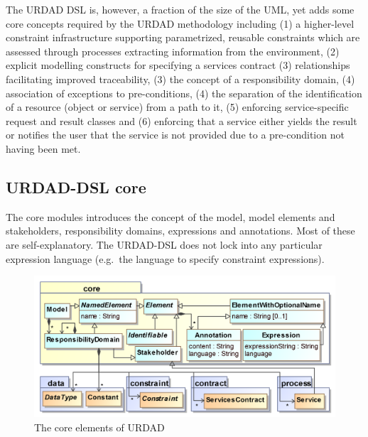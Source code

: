 The URDAD DSL is, however, a fraction of the size of the UML, yet adds some core concepts required by the URDAD methodology including (1) a higher-level constraint infrastructure supporting parametrized, reusable constraints which are assessed through processes extracting information from the environment, (2) explicit modelling constructs for specifying a services contract (3) relationships facilitating improved traceability, (3) the concept of a responsibility domain, (4) association of exceptions to pre-conditions, (4)
the separation of the identification of a resource (object or service) from a path to it, (5) enforcing service-specific request and result classes and (6) enforcing that a service either yields the result or notifies the user that the service is not provided due to a pre-condition not having been met.


\subsection{URDAD-DSL core}

The core modules introduces the concept of the model, model elements and stakeholders, responsibility domains, expressions and annotations. Most of these are self-explanatory. The URDAD-DSL does not lock into any particular expression language (e.g.\ the language to specify constraint expressions). 

\begin{figure}[Htb]
  \centering
  \includegraphics{core}
  \caption{The core elements of URDAD}
  \label{fig:metamodel}
\end{figure}


